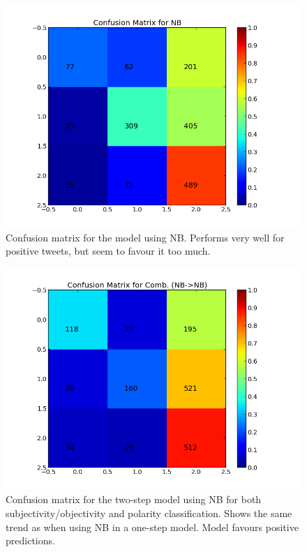  \begin{minipage}[!htb]{\linewidth}
      \centering
     \begin{minipage}{0.45\linewidth}
          \begin{figure}[H]
               \includegraphics[width=\linewidth]{../img/plots/grid/confusion_matrix_NB.png}
           \caption[Plot showing the confusion matrix for NB]{Confusion matrix for the model using NB. Performs very well for positive tweets, but seem to favour it too much.}
           \label{fig:confmat_nb}
          \end{figure}
     \end{minipage}
     \hspace{0.05\linewidth}
     \begin{minipage}{0.45\linewidth}
          \begin{figure}[H]
               \includegraphics[width=\linewidth]{../img/plots/grid/confusion_matrix_Comb-NB-NB.png}
           \caption[Plot showing the confusion matrix for two-step NB -> NB]{Confusion matrix for the two-step model using NB for both subjectivity/objectivity and polarity classification. Shows the same trend as when using NB in a one-step model. Model favours positive predictions.}
           \label{fig:confmat_nb_nb}
          \end{figure}
     \end{minipage}
\end{minipage}

